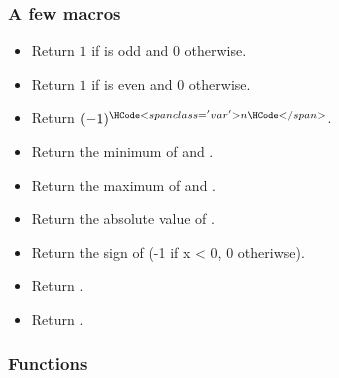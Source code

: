 \subsubsection{A few macros}
\begin{itemize}
\item {}
  \sshortdescribe Return $1$ if  is odd and $0$ otherwise.
\item {}
  \sshortdescribe Return $1$ if  is even and $0$ otherwise.
\item {}
  \sshortdescribe Return $(-1)^{\var{n}}$.
\item {}
  \sshortdescribe Return the minimum of  and .
\item {}
  \sshortdescribe Return the maximum of  and .
\item {}
  \sshortdescribe Return the absolute value of .
\item {}
  \sshortdescribe Return the sign of  (-1 if x < 0, 0 otheriwse).
\item {}
  \sshortdescribe Return .
\item {}
  \sshortdescribe Return .
\end{itemize}

\subsubsection{Functions}

